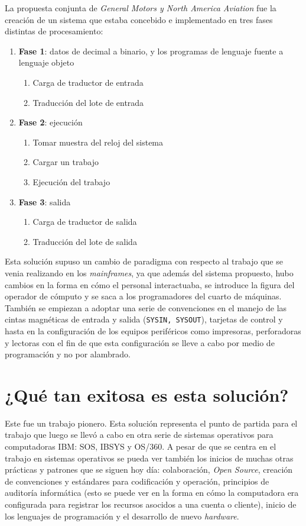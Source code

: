 La propuesta conjunta de \textit{General Motors \textnormal{y} North America Aviation} fue la creación de un sistema que estaba concebido e implementado en tres fases distintas de procesamiento: 
\begin{enumerate}
    \item \textbf{Fase 1}: datos de decimal a binario, y los programas de lenguaje fuente a lenguaje objeto 
    \begin{enumerate}
        \item Carga de traductor de entrada
        \item Traducción del lote de entrada 
    \end{enumerate}
    \item \textbf{Fase 2}: ejecución
    \begin{enumerate}
        \item Tomar muestra del reloj del sistema
        \item Cargar un trabajo
        \item Ejecución del trabajo
    \end{enumerate}
    \item \textbf{Fase 3}: salida
    \begin{enumerate}
        \item Carga de traductor de salida
        \item Traducción del lote de salida
    \end{enumerate}        
\end{enumerate}
 
Esta solución supuso un cambio de paradigma con respecto al trabajo que se venia realizando en los \textit{mainframes}, ya que además del sistema propuesto, hubo cambios en la forma en cómo el personal interactuaba, se introduce la figura del operador de cómputo y se saca a los programadores del cuarto de máquinas. También se empiezan a adoptar una serie de convenciones en el manejo de las cintas magnéticas de entrada y salida (\texttt{SYSIN, SYSOUT}), tarjetas de control y hasta en la configuración de los equipos periféricos como impresoras, perforadoras y lectoras con el fin de que esta configuración se lleve a cabo por medio de programación y no por alambrado.

\section{¿Qué tan exitosa es esta solución?}

Este fue un trabajo pionero. Esta solución representa el punto de partida para el trabajo que luego se llevó a cabo en otra serie de sistemas operativos para computadoras \textsc{IBM}: SOS, IBSYS y OS/360. A pesar de que se centra en el trabajo en sistemas operativos se pueda ver también los inicios de muchas otras prácticas y patrones que se siguen hoy día: colaboración, \textit{Open Source}, creación de convenciones y estándares para codificación y operación, principios de auditoría informática (esto se puede ver en la forma en cómo la computadora era configurada para registrar los recursos asocidos a una cuenta o cliente), inicio de los lenguajes de programación y el desarrollo de nuevo \textit{hardware}. 